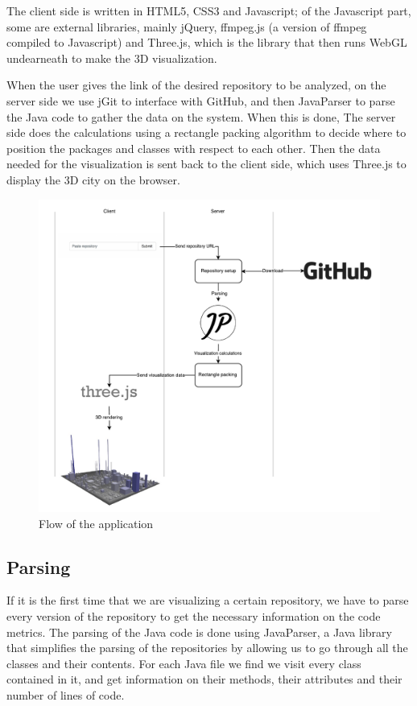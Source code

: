 \documentclass[]{usiinfbachelorproject}
\begin{document}
The client side is written in HTML5, CSS3 and Javascript; of the Javascript part, some are external libraries, mainly jQuery, ffmpeg.js (a version of ffmpeg compiled to Javascript) and Three.js, which is the library that then runs WebGL undearneath to make the 3D visualization.

When the user gives the link of the desired repository to be analyzed, on the server side we use jGit to interface with GitHub, and then JavaParser to parse the Java code to gather the data on the system. When this is done, The server side does the calculations using a rectangle packing algorithm to decide where to position the packages and classes with respect to each other. Then the data needed for the visualization is sent back to the client side, which uses Three.js to display the 3D city on the browser.

\begin{figure} [H]
\centering
\includegraphics[width=1\textwidth]{pictures/flow.pdf}
\caption{Flow of the application}
\label{fig:flow}
\end{figure}

\subsection{Parsing} \label{Parsing}
If it is the first time that we are visualizing a certain repository, we have to parse every version of the repository to get the necessary information on the code metrics.
The parsing of the Java code is done using JavaParser, a Java library that simplifies the parsing of the repositories by allowing us to go through all the classes and their contents.
For each Java file we find we visit every class contained in it, and get information on their methods, their attributes and their number of lines of code.
\end{document}
